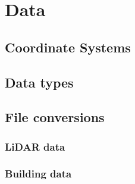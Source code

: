 \section{Data}



\subsection{Coordinate Systems}


\subsection{Data types}


\subsection{File conversions}

\subsubsection{LiDAR data}


\subsubsection{Building data}

